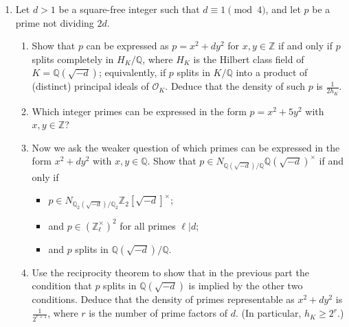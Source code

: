 \documentclass[11pt,answers,addpoints,reqno]{exam}
\theoremstyle{definition}
\theoremstyle{remark}
\theoremstyle{definition}
\theoremstyle{remark}
\theoremstyle{remark}
\theoremstyle{remark}
\newcommand{\Q}{\mathbb{Q}}
\newcommand{\Z}{\mathbb{Z}}
\newcommand{\mc}{\mathcal}
\begin{document}
\begin{enumerate}
\begin{enumerate}
\end{enumerate}
\item Let $d>1$ be a square-free integer such that $d \equiv 1 \pmod 4$, and let $p$ be a prime not dividing $2d$.
\begin{enumerate}
\item Show that $p$ can be expressed as $p=x^2+dy^2$ for $x, y \in \Z$ if and only if $p$ splits completely in $H_K/\Q$, where $H_K$ is the Hilbert class field of $K= \Q(\sqrt{-d})$; equivalently, if $p$ splits in $K/\Q$ into a product of (distinct) principal ideals of $\mc{O}_K$. Deduce that the density of such $p$ is $\frac{1}{2h_K}$.
\item Which integer primes can be expressed in the form $p=x^2+5y^2$ with $x, y \in \Z$?
\item Now we ask the weaker question of which primes can be expressed in the form $x^2+dy^2$ with $x, y \in \Q$. Show that $p \in N_{\Q(\sqrt{-d})/\Q} \Q(\sqrt{-d})^{\times}$ if and only if 
\begin{itemize}
\item $p \in N_{\Q_2(\sqrt{-d})/\Q_2} \Z_2[\sqrt{-d}]^{\times}$;
\item and $p \in (\Z_{\ell}^{\times})^2$ for all primes $\ell \vert d$;
\item and $p$ splits in $\Q(\sqrt{-d})/\Q$.
\end{itemize}
\item Use the reciprocity theorem to show that in the previous part the condition that $p$ splits in $\Q(\sqrt{-d})$ is implied by the other two conditions. Deduce that the density of primes representable as $x^2+dy^2$ is $\frac{1}{2^{r+1}}$, where $r$ is the number of prime factors of $d$. (In particular, $h_K \geq 2^{r}$.)
\end{enumerate}
\end{enumerate}
\end{document}
